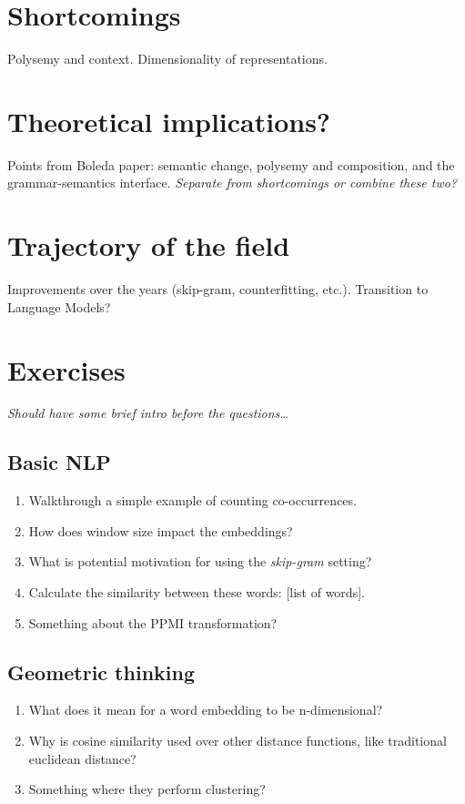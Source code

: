 \section{Shortcomings}
Polysemy and context.
Dimensionality of representations.

\section{Theoretical implications?}
Points from Boleda paper: semantic change, polysemy and composition, and the grammar-semantics interface.
\textit{Separate from shortcomings or combine these two?}

\section{Trajectory of the field}
Improvements over the years (skip-gram, counterfitting, etc.).
Transition to Language Models?

\section{Exercises}

\textit{Should have some brief intro before the questions\dots}

\subsection{Basic NLP}

\begin{enumerate}
\item Walkthrough a simple example of counting co-occurrences.
\item How does window size impact the embeddings?
\item What is potential motivation for using the \textit{skip-gram} setting?
\item Calculate the similarity between these words: [list of words]. 
\item Something about the PPMI transformation?
\end{enumerate}

\subsection{Geometric thinking}

\begin{enumerate}
\item What does it mean for a word embedding to be n-dimensional?
\item Why is cosine similarity used over other distance functions, like traditional euclidean distance?
\item Something where they perform clustering?
\end{enumerate}

